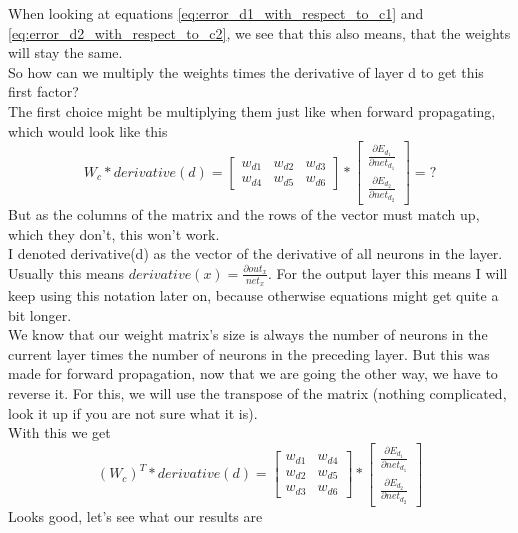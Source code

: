 \documentclass[11pt, halfparskip]{article}
\begin{document}
    \newpage \noindent
    When looking at equations \ref{eq:error_d1_with_respect_to_c1} and \ref{eq:error_d2_with_respect_to_c2}, we see that this also means, that the weights will stay the same.\\
    So how can we multiply the weights times the derivative of layer d to get this first factor?\\
    The first choice might be multiplying them just like when forward propagating, which would look like this
    \[
    	W_c * derivative(d) = 
    	\begin{bmatrix}
    		w_{d1} & w_{d2} & w_{d3}\\
            	w_{d4} & w_{d5} & w_{d6}
    	\end{bmatrix}
    	*
    	\begin{bmatrix}
    		\frac{\partial E_{d_1}}{\partial net_{d_1}}\\
    		\frac{\partial E_{d_2}}{\partial net_{d_2}}
    	\end{bmatrix}
    	= ?
    \]
    But as the columns of the matrix and the rows of the vector must match up, which they don't, this won't work.\\
    I denoted derivative(d) as the vector of the derivative of all neurons in the layer. Usually this means $derivative(x) = \frac{\partial out_x}{net_x}$. For the output layer this means 
    I will keep using this notation later on, because otherwise equations might get quite a bit longer.\\
    We know that our weight matrix's size is always the number of neurons in the current layer times the number of neurons in the preceding layer. But this was made for forward 
    propagation, now that we are going the other way, we have to reverse it. For this, we will use the transpose of the matrix (nothing complicated, look it up if you are not sure what it
    is).\\
    With this we get
    \[
    	(W_c)^T * derivative(d) = 
    	\begin{bmatrix}
    		w_{d1} & w_{d4}\\
            	w_{d2} & w_{d5}\\
            	w_{d3} & w_{d6}
    	\end{bmatrix}
    	*
    	\begin{bmatrix}
    		\frac{\partial E_{d_1}}{\partial net_{d_1}}\\
    		\frac{\partial E_{d_2}}{\partial net_{d_2}}
    	\end{bmatrix}
    \]
    Looks good, let's see what our results are
\end{document}
